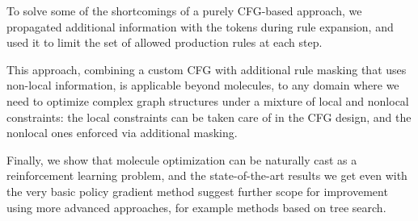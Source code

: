 \documentclass{article}
\begin{document}
To solve some of the shortcomings of a purely CFG-based approach, we propagated additional information with the tokens during rule expansion, and used it to limit the set of allowed production rules at each step. 

This approach, combining a custom CFG with additional rule masking that uses non-local information, is applicable beyond molecules, to any domain where we need to optimize complex graph structures under a mixture of local and nonlocal constraints: the local constraints can be taken care of in the CFG design, and the nonlocal ones enforced via additional masking.

Finally, we show that molecule optimization can be naturally cast as a reinforcement learning problem, and the state-of-the-art results we get even with the very basic policy gradient method suggest further scope for improvement using more advanced approaches, for example methods based on tree search.



\end{document}
